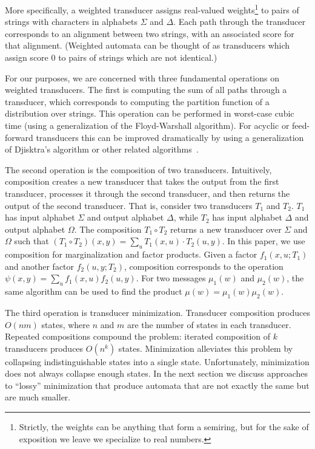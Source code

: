 \documentclass[11pt,a4paper]{article}
\begin{document}
More specifically, a weighted transducer assigns real-valued
weights\footnote{Strictly, the weights can be anything that form a
semiring, but for the sake of exposition we leave we specialize
to real numbers.} to pairs of strings with characters in alphabets $\Sigma$
and $\Delta$. Each path through the transducer corresponds to an
alignment between two strings, with an associated score for that
alignment. (Weighted automata can be thought of as transducers which
assign score 0 to pairs of strings which are not identical.)

For our purposes, we are concerned with three fundamental operations
on weighted transducers. The first is computing the sum of all paths
through a transducer, which corresponds to computing the partition
function of a distribution over strings. This operation can be
performed in worst-case cubic time (using a generalization of the
Floyd-Warshall algorithm).  For acyclic or feed-forward transducers
this can be improved dramatically by using a generalization of
Djisktra's algorithm or other related algorithms~\cite{mohri09weighted}.

The second operation is the composition of two transducers.
Intuitively, composition creates a new transducer that takes the
output from the first transducer, processes it through the second
transducer, and then returns the output of the second transducer.
That is, consider two transducers $T_1$ and $T_2$. $T_1$ has input
alphabet $\Sigma$ and output alphabet $\Delta$, while $T_2$ has
input alphabet $\Delta$ and output alphabet $\Omega$. The composition
$T_1 \circ T_2$ returns a new transducer over $\Sigma$ and $\Omega$
such that $(T_1 \circ T_2)(x,y) = \sum_{u} T_1(x,u)\cdot T_2(u,y)$.
In this paper, we use composition for marginalization and factor
products. Given a factor $f_1(x,u;T_1)$ and another factor $f_2(u,y;T_2)$,
composition corresponds to the operation $\psi(x,y) = \sum_u f_1(x,u)
f_2(u,y)$. For two messages $\mu_1(w)$ and $\mu_2(w)$, the same
algorithm can be used to find the product $\mu(w) = \mu_1(w)\mu_2(w)$.

The third operation is transducer minimization. Transducer composition
produces $O(nm)$ states, where $n$ and $m$ are the number of states
in each transducer. Repeated compositions compound the problem:
iterated composition of $k$ transducers produces $O(n^k)$ states.
Minimization alleviates this problem by collapsing indistinguishable
states into a single state. Unfortunately, minimization does not
always collapse enough states. In the next section we discuss approaches
to ``lossy'' minimization that produce automata that are not exactly
the same but are much smaller.
\end{document}
